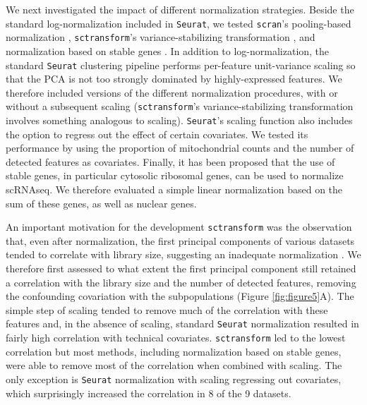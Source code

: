 \documentclass{bmcart}
\begin{document}
We next investigated the impact of different normalization strategies. Beside the standard log-normalization included in \texttt{Seurat}, we tested \texttt{scran}'s pooling-based normalization \citep{lunPooling2016}, \texttt{sctransform}'s variance-stabilizing transformation \citep{hafemeisterSCtransform2019}, and normalization based on stable genes \citep{linStableGenes2018, deekeStablyExpressed2018}. 
In addition to log-normalization, the standard \texttt{Seurat} clustering pipeline performs per-feature unit-variance scaling so that the PCA is not too strongly dominated by highly-expressed features. We therefore included versions of the different normalization procedures, with or without a subsequent scaling (\texttt{sctransform}'s variance-stabilizing transformation involves something analogous to scaling). 
\texttt{Seurat}'s scaling function also includes the option to regress out the effect of certain covariates. We tested its performance by using the proportion of mitochondrial counts and the number of detected features as covariates. Finally, it has been proposed that the use of stable genes, in particular cytosolic ribosomal genes, can be used to normalize scRNAseq\citep{deekeStablyExpressed2018}. We therefore evaluated a simple linear normalization based on the sum of these genes, as well as nuclear genes.

An important motivation for the development \texttt{sctransform} was the observation that, even after normalization, the first principal components of various datasets tended to correlate with library size, suggesting an inadequate normalization \citep{hafemeisterSCtransform2019}. We therefore first assessed to what extent the first principal component still retained a correlation with the library size and the number of detected features, removing the confounding covariation with the subpopulations (Figure \ref{fig:figure5}A). The simple step of scaling tended to remove much of the correlation with these features and, in the absence of scaling, standard \texttt{Seurat} normalization resulted in fairly high correlation with technical covariates. \texttt{sctransform} led to the lowest correlation but most methods, including normalization based on stable genes, were able to remove most of the correlation when combined with scaling. The only exception is \texttt{Seurat} normalization with scaling regressing out covariates, which surprisingly increased the correlation in 8 of the 9 datasets.
\end{document}
